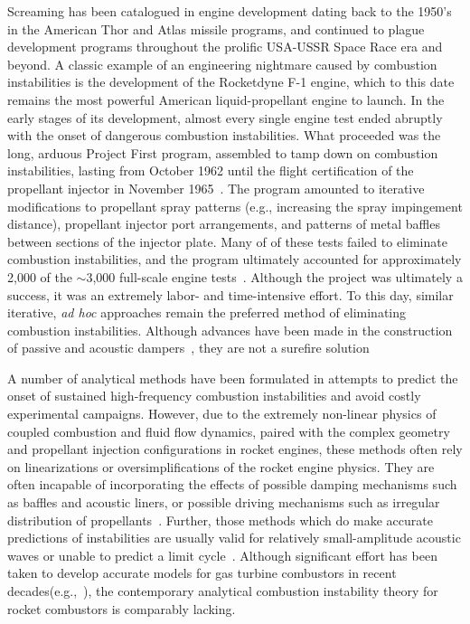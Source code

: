 Screaming has been catalogued in engine development dating back to the 1950's in the American Thor and Atlas missile programs, and continued to plague development programs throughout the prolific USA-USSR Space Race era and beyond. A classic example of an engineering nightmare caused by combustion instabilities is the development of the Rocketdyne F-1 engine, which to this date remains the most powerful American liquid-propellant engine to launch. In the early stages of its development, almost every single engine test ended abruptly with the onset of dangerous combustion instabilities. What proceeded was the long, arduous Project First program, assembled to tamp down on combustion instabilities, lasting from October 1962 until the flight certification of the propellant injector in November 1965~\cite{Young2008}. The program amounted to iterative modifications to propellant spray patterns (e.g., increasing the spray impingement distance), propellant injector port arrangements, and patterns of metal baffles between sections of the injector plate. Many of of these tests failed to eliminate combustion instabilities, and the program ultimately accounted for approximately 2,000 of the $\sim$3,000 full-scale engine tests~\cite{Oefelein1993}. Although the project was ultimately a success, it was an extremely labor- and time-intensive effort. To this day, similar iterative, \textit{ad hoc} approaches remain the preferred method of eliminating combustion instabilities. Although advances have been made in the construction of passive and acoustic dampers~\cite{Zhao2015}, they are not a surefire solution

A number of analytical methods have been formulated in attempts to predict the onset of sustained high-frequency combustion instabilities and avoid costly experimental campaigns. However, due to the extremely non-linear physics of coupled combustion and fluid flow dynamics, paired with the complex geometry and propellant injection configurations in rocket engines, these methods often rely on linearizations or oversimplifications of the rocket engine physics. They are often incapable of incorporating the effects of possible damping mechanisms such as baffles and acoustic liners, or possible driving mechanisms such as irregular distribution of propellants~\cite{Yang1995}. Further, those methods which do make accurate predictions of instabilities are usually valid for relatively small-amplitude acoustic waves or unable to predict a limit cycle~\cite{Culick1994}. Although significant effort has been taken to develop accurate models for gas turbine combustors in recent decades(e.g.,~\cite{Noiray2008}), the contemporary analytical combustion instability theory for rocket combustors is comparably lacking.

